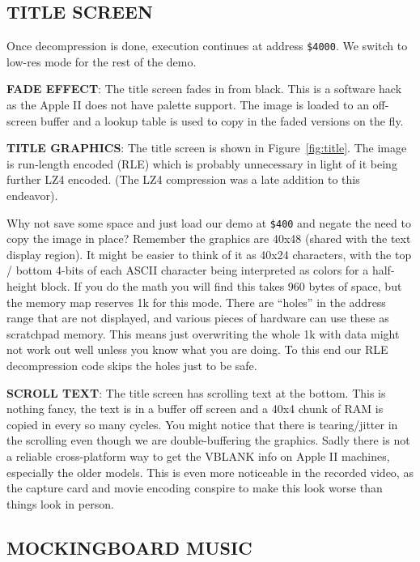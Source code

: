 \documentclass[twocolumn]{article}
\begin{document}
\subsection{TITLE SCREEN}

Once decompression is done, execution continues at address {\tt \$4000}.
We switch to low-res mode for the rest of the demo.

\noindent
{\bf FADE EFFECT}:
The title screen fades in from black.
This is a software hack as the Apple II does not have palette support.
The image is loaded to an off-screen buffer and a lookup table is used to
copy in the faded versions on the fly.

\noindent
{\bf TITLE GRAPHICS}:
The title screen is shown in Figure~\ref{fig:title}.
The image is run-length encoded (RLE) which is
probably unnecessary in light of it being further LZ4 encoded.
(The LZ4 compression was a late addition to this endeavor).

Why not save some space and just load our demo at {\tt \$400} and negate
the need
to copy the image in place?
Remember the graphics are 40x48 (shared with the text display region).
It might be easier to think of it as 40x24 characters, with the top / bottom
4-bits of each ASCII character being interpreted as colors for a half-height
block.
If you do the math you will find this takes 960 bytes of space, but the memory
map reserves 1k for this mode.
There are ``holes'' in the address range that are not displayed, and 
various pieces of hardware can use these as scratchpad memory.  
This means just overwriting the whole 1k with data might not work out well
unless you know what you are doing.
To this end our RLE decompression code skips the holes just to be safe.

\noindent
{\bf SCROLL TEXT}:
The title screen has scrolling text at the bottom.
This is nothing fancy, the text is in a buffer off screen and a 40x4 
chunk of RAM is copied in every so many cycles.
You might notice that there is tearing/jitter in the scrolling even
though we are double-buffering the graphics.  
Sadly there is not a reliable cross-platform way to get the VBLANK info 
on Apple II machines, especially the older models.
This is even more noticeable in the recorded video, as the capture card and
movie encoding conspire to make this look worse than things look in person.

\subsection{MOCKINGBOARD MUSIC}
\end{document}
